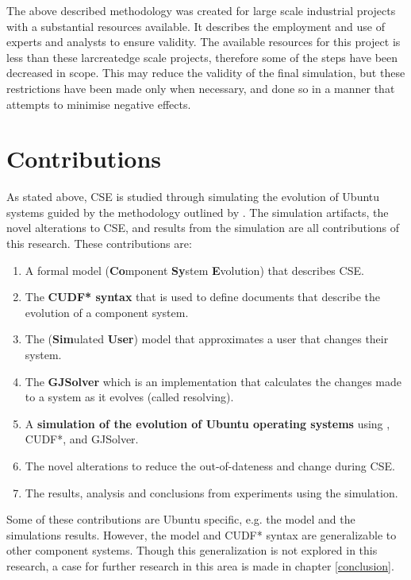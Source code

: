 The above described methodology was created for large scale industrial projects with a substantial resources available.
It describes the employment and use of experts and analysts to ensure validity.
The available resources for this project is less than these larcreatedge scale projects, therefore some of the steps have been decreased in scope.
This may reduce the validity of the final simulation, but these restrictions have been made only when necessary,
and done so in a manner that attempts to minimise negative effects.

\section{Contributions}
As stated above, CSE is studied through simulating the evolution of Ubuntu systems guided by the methodology outlined by \cite{Law2005}.
The simulation artifacts, the novel alterations to CSE, and results from the simulation are all contributions of this research. 
These contributions are:
\begin{enumerate}
  \item A formal model \textbf{\modelname} (\textbf{Co}mponent \textbf{Sy}stem \textbf{E}volution) that describes CSE. 
  \item The \textbf{CUDF* syntax} that is used to define documents that describe the evolution of a component system.
  \item The \textbf{\usermodel} (\textbf{Sim}ulated \textbf{User}) model that approximates a user that changes their system.
  \item The \textbf{GJSolver} which is an implementation that calculates the changes made to a system as it evolves (called resolving).
  \item A \textbf{simulation of the evolution of Ubuntu operating systems} using \modelname, CUDF*, \usermodel and GJSolver.
  \item The novel alterations to reduce the out-of-dateness and change during CSE. 
  \item The results, analysis and conclusions from experiments using the simulation.
\end{enumerate}

Some of these contributions are Ubuntu specific, e.g. the \usermodel model and the simulations results.
However, the \modelname model and CUDF* syntax are generalizable to other component systems.
Though this generalization is not explored in this research, a case for further research in this area is made in chapter \ref{conclusion}.

